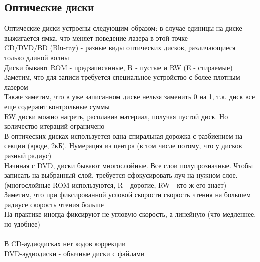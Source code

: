 \documentclass[12pt]{article}
\begin{document}
\subsection{Оптические диски}
Оптические диски устроены следующим образом: в случае единицы на диске выжигается ямка, что меняет поведение лазера в этой точке\\
CD/DVD/BD (Blu-ray) - разные виды оптических дисков, различающиеся только длиной волны\\
Диски бывают ROM - предзаписанные, R - пустые и RW (E - стираемые)\\
Заметим, что для записи требуется специальное устройство с более плотным лазером\\
Также заметим, что в уже записанном диске нельзя заменить 0 на 1, т.к. диск все еще содержит контрольные суммы\\
RW диски можно нагреть, расплавив материал, получая пустой диск. Но количество итераций ограничено\\
В оптических дисках используется одна спиральная дорожка с разбиением на секции (вроде, 2кБ). Нумерация из центра (в том числе потому, что у дисков разный радиус)\\
Начиная с DVD, диски бывают многослойные. Все слои полупрозначные. Чтобы записать на выбранный слой, требуется сфокусировать луч на нужном слое. (многослойные ROM используются, R - дорогие, RW - кто ж его знает)\\
Заметим, что при фиксированной угловой скорости скорость чтения на большем радиусе скорость чтения больше\\
На практике иногда фиксируют не угловую скорость, а линейную (что медленнее, но удобнее)\\\\
В CD-аудиодисках нет кодов коррекции\\
DVD-аудиодиски - обычные диски с файлами
\end{document}
